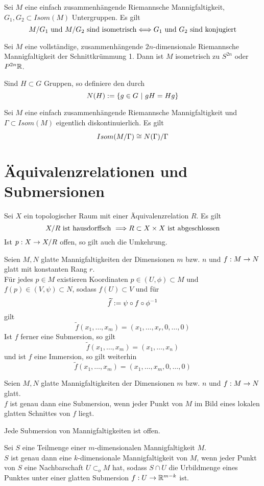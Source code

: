 \documentclass{book}
\begin{document}
\Prop{}
Sei $M$ eine einfach zusammenhängende Riemannsche Mannigfaltigkeit, $G_1, G_2 \subset Isom(M)$ Untergruppen. Es gilt
\[ M/G_1 \text{ und } M/G_2 \text{ sind isometrisch} \overset{}{\Longleftrightarrow} G_1 \text{ und }G_2 \text{ sind konjugiert} \]

\Prop{}
Sei $M$ eine vollständige, zusammenhängende $2n$-dimensionale Riemannsche Mannigfaltigkeit der Schnittkrümmung 1. Dann ist $M$ isometrisch zu $S^{2n}$ oder $P^{2n}\mathbb{R}$.

\Def{}
Sind $H \subset G$ Gruppen, so definiere den  durch
\[ N(H) := \set{g \in G}{gH = Hg} \]

\Prop{}
Sei $M$ eine einfach zusammenhängende Riemannsche Mannigfaltigkeit und $\Gamma \subset Isom(M)$ eigentlich diskontinuierlich. Es gilt
\[ Isom(M/\Gamma) \overset{}{\cong} N(\Gamma) / \Gamma \]

\newpage
\section{Äquivalenzrelationen und Submersionen}
\Lem{}
Sei $X$ ein topologischer Raum mit einer Äquivalenzrelation $R$. Es gilt
\[ X/R \text{ ist hausdorffsch }\overset{}{\Longrightarrow}  R \subset X \times X \text{ ist abgeschlossen} \]
Ist $p : X \overset{}{\rightarrow} X/R$ offen, so gilt auch die Umkehrung.

Seien $M,N$ glatte Mannigfaltigkeiten der Dimensionen $m$ bzw. $n$ und $f : M\overset{}{\rightarrow} N$ glatt mit konstanten Rang $r$.\\
Für jedes $p \in M$ existieren Koordinaten $p\in (U,\phi) \subset M$ und $f(p) \in (V, \psi) \subset N$, sodass $f(U) \subset V$ und für
\[ \widetilde{f} := \psi \circ f \circ \phi^{-1} \]
gilt
\[ \widetilde{f}(x_1,\ldots,x_m) = (x_1,\ldots, x_r, 0,\ldots, 0) \]
Ist $f$ ferner eine Submersion, so gilt
\[ \widetilde{f}(x_1,\ldots,x_m) = (x_1,\ldots, x_n) \]
und ist $f$ eine Immersion, so gilt weiterhin
\[ \widetilde{f}(x_1,\ldots,x_m) = (x_1,\ldots, x_m, 0,\ldots, 0) \]

\Kor{}
Seien $M,N$ glatte Mannigfaltigkeiten der Dimensionen $m$ bzw. $n$ und $f : M\overset{}{\rightarrow} N$ glatt.\\
$f$ ist genau dann eine Submersion, wenn jeder Punkt von $M$ im Bild eines lokalen glatten Schnittes von $f$ liegt.

\Kor{}
Jede Submersion von Mannigfaltigkeiten ist offen.

\Prop{}
Sei $S$ eine Teilmenge einer $m$-dimensionalen Mannigfaltigkeit $M$.\\
$S$ ist genau dann eine $k$-dimensionale Mannigfaltigkeit von $M$, wenn jeder Punkt von $S$ eine Nachbarschaft $U \subset_o M$ hat, sodass $S\cap U$ die Urbildmenge eines Punktes unter einer glatten Submersion $f : U \overset{}{\rightarrow} \mathbb{R}^{m - k}$ ist.
\end{document}
